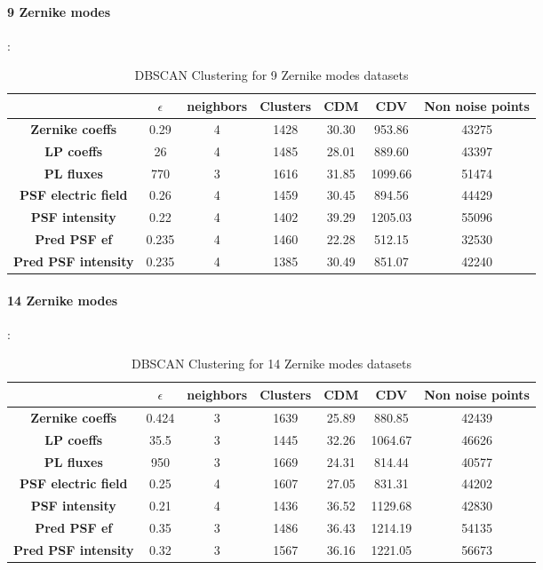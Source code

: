 		\paragraph{9 Zernike modes}:
		\begin{table}[h!]
			\centering
			\begin{tabular}{|c|c|c|c|c|c|c|}
				\hline
				\textbf{} & \textbf{$\epsilon$} & \textbf{neighbors} & \textbf{Clusters} & \textbf{CDM} & \textbf{CDV} & \textbf{Non noise points}\\
				\hline
				\textbf{Zernike coeffs} & 0.29 & 4 & 1428 & 30.30 & 953.86 & 43275 \\
				\hline
				\textbf{LP coeffs} & 26 & 4 & 1485 & 28.01 & 889.60 & 43397 \\
				\hline
				\textbf{PL fluxes} & 770 & 3 & 1616 & 31.85 & 1099.66 & 51474 \\
				\hline
				\textbf{PSF electric field} & 0.26 & 4 & 1459 & 30.45 & 894.56 & 44429 \\
				\hline
				\textbf{PSF intensity} & 0.22 & 4 & 1402 & 39.29 & 1205.03 & 55096 \\
				\hline
				\textbf{Pred PSF ef} & 0.235 & 4 & 1460 & 22.28 & 512.15 & 32530 \\
				\hline
				\textbf{Pred PSF intensity} & 0.235 & 4 & 1385 & 30.49 & 851.07 & 42240 \\
				\hline
			\end{tabular}
		\caption{DBSCAN Clustering for 9 Zernike modes datasets}
		\end{table}
		\FloatBarrier
		
		\paragraph{14 Zernike modes}:
		\begin{table}[h!]
			\centering
			\begin{tabular}{|c|c|c|c|c|c|c|}
				\hline
				\textbf{} & \textbf{$\epsilon$} & \textbf{neighbors} & \textbf{Clusters} & \textbf{CDM} & \textbf{CDV} & \textbf{Non noise points}\\
				\hline
				\textbf{Zernike coeffs} & 0.424 & 3 & 1639 & 25.89 & 880.85 & 42439 \\
				\hline
				\textbf{LP coeffs} & 35.5 & 3 & 1445 & 32.26 & 1064.67 & 46626 \\
				\hline
				\textbf{PL fluxes} & 950 & 3 & 1669 & 24.31 & 814.44 & 40577 \\
				\hline
				\textbf{PSF electric field} & 0.25 & 4 & 1607 & 27.05 & 831.31 & 44202 \\
				\hline
				\textbf{PSF intensity} & 0.21 & 4 & 1436 & 36.52 & 1129.68 & 42830 \\
				\hline
				\textbf{Pred PSF ef} & 0.35 & 3 & 1486 & 36.43 & 1214.19 & 54135  \\
				\hline
				\textbf{Pred PSF intensity} & 0.32 & 3 & 1567 & 36.16 & 1221.05 & 56673 \\
				\hline
			\end{tabular}
		\caption{DBSCAN Clustering for 14 Zernike modes datasets}
		\end{table}
		\FloatBarrier
		

